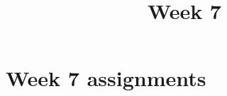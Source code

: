 \documentclass{xourse}
\title{Week 7}
\begin{document}
\begin{abstract}
\end{abstract}
\maketitle

\part{Week 7 assignments}
\end{document}
